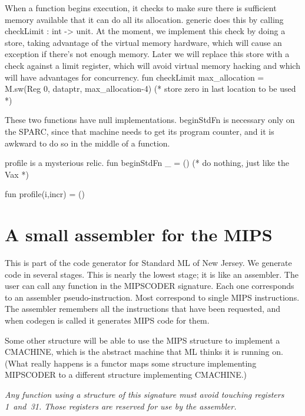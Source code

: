 \endcode
{}
When a function begins execution, it checks to make sure there is sufficient
memory available that it can do all its allocation.
generic does this by calling \code{}checkLimit : int -> unit\edoc{}.
At the moment, we implement this check by doing a store,
taking advantage of the virtual memory hardware, which will cause an exception
if there's not enough memory.
Later we will replace this store with a check against a limit register,
which will avoid virtual memory hacking and which will have advantages
for concurrency.
\enddocs
{}
\endmoddef
fun checkLimit max_allocation = M.sw(Reg 0, dataptr, max_allocation-4)
                              (* store zero in last location to be used *)

\endcode
{}
These two functions have null implementations.
\code{}beginStdFn\edoc{} is necessary only on the SPARC, since that machine needs to get 
its program counter, and it is awkward to do so in the middle of a function.

\code{}profile\edoc{} is a mysterious relic.
\enddocs
{}
\endmoddef
fun beginStdFn _ = ()           (* do nothing, just like the Vax *)

fun profile(i,incr) = ()

\endcode
{}


\chapter{A small assembler for the MIPS}
This is part of the code generator for Standard ML of New Jersey.
We generate code in several stages.
This is nearly the lowest stage; it is like an assembler.
The user can call any function in the MIPSCODER signature.
Each one corresponds to an assembler pseudo-instruction.
Most correspond to single MIPS instructions.
The assembler remembers all the instructions that have been 
requested, and when \code{}codegen\edoc{} is called it generates MIPS
code for them.

Some other structure will be able to use the MIPS structure to implement
a \code{}CMACHINE\edoc{}, which is the abstract machine that ML thinks it is running
on.
(What really happens is a functor maps some structure 
implementing \code{}MIPSCODER\edoc{} to a different structure implementing 
\code{}CMACHINE\edoc{}.)

{\em Any function using a structure of this signature must avoid
touching registers 1~and~31.
Those registers are reserved for use by the assembler.}

